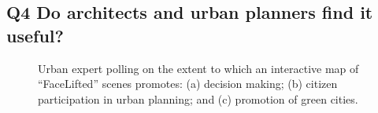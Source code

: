 \subsection*{Q4 Do architects and urban planners find it useful?}

\begin{figure}[!t]
	\centering
	\hspace*{-5mm}
	\caption{Urban expert polling on the extent to which an interactive map of ``FaceLifted'' scenes promotes: (a) decision making; (b) citizen participation in urban planning; and (c) promotion of green cities.}
	\label{fig:pies}
	\vspace{-0.4cm}
\end{figure}

